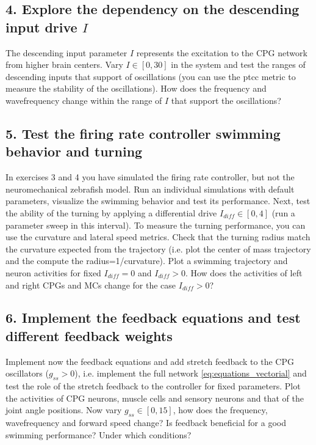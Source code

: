 \documentclass{cmc}
\begin{document}


\subsection*{4. Explore the dependency on the descending input drive $I$}\label{sec:ex4}
The descending input parameter $I$ represents the excitation to the CPG network from higher brain centers. Vary $I \in \left[0,30 \right]$ in the system and test the ranges of descending inputs that support of oscillations (you can use the ptcc metric to measure the stability of the oscillations). How does the frequency and wavefrequency change within the range of $I$ that support the oscillations?







\subsection*{5. Test the firing rate controller swimming behavior and turning}\label{sec:ex5}
In exercises 3 and 4 you have simulated the firing rate controller, but not the neuromechanical zebrafish model. Run an individual simulations with default parameters, visualize the swimming behavior and test its performance. Next, test the ability of the turning by applying a differential drive $I_{diff} \in \left[ 0,4 \right]$ (run a parameter sweep in this interval). To measure the turning performance, you can use the curvature and lateral speed metrics. Check that the turning radius match the curvature expected from the trajectory (i.e. plot the center of mass trajectory and the compute the radius=1/curvature). Plot a swimming trajectory and neuron activities for fixed $I_{diff}=0$ and $I_{diff}>0$. How does the activities of left and right CPGs and MCs change for the case $I_{diff}>0$?





\subsection*{6. Implement the feedback equations and test different feedback weights}\label{sec:ex6}
Implement now the feedback equations and add stretch feedback to the CPG oscillators ($g_{ss} > 0$), i.e. implement the full network \ref{eq:equations_vectorial} and test the role of the stretch feedback to the controller for fixed parameters. Plot the activities of CPG neurons, muscle cells and sensory neurons and that of the joint angle positions. Now vary $g_{ss} \in \left[0,15 \right]$, how does the frequency, wavefrequency and forward speed change? Is feedback beneficial for a good swimming performance? Under which conditions?
\end{document}
